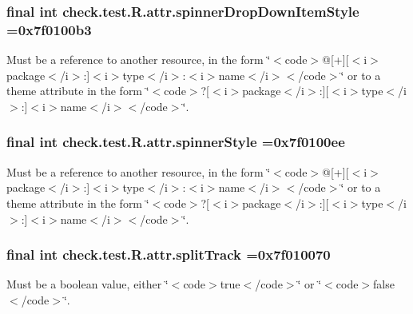 \subsubsection[{spinner\+Drop\+Down\+Item\+Style}]{\setlength{\rightskip}{0pt plus 5cm}final int check.\+test.\+R.\+attr.\+spinner\+Drop\+Down\+Item\+Style =0x7f0100b3\hspace{0.3cm}{\ttfamily [static]}}\label{classcheck_1_1test_1_1_r_1_1attr_a020a7df4dde5cf057bd1e5101a5782dc}
Must be a reference to another resource, in the form \char`\"{}$<$code$>$@\mbox{[}+\mbox{]}\mbox{[}$<$i$>$package$<$/i$>$\+:\mbox{]}$<$i$>$type$<$/i$>$\+:$<$i$>$name$<$/i$>$$<$/code$>$\char`\"{} or to a theme attribute in the form \char`\"{}$<$code$>$?\mbox{[}$<$i$>$package$<$/i$>$\+:\mbox{]}\mbox{[}$<$i$>$type$<$/i$>$\+:\mbox{]}$<$i$>$name$<$/i$>$$<$/code$>$\char`\"{}. \hypertarget{classcheck_1_1test_1_1_r_1_1attr_a8fc35d027aa55da918e529af0239cd45}{}
\subsubsection[{spinner\+Style}]{\setlength{\rightskip}{0pt plus 5cm}final int check.\+test.\+R.\+attr.\+spinner\+Style =0x7f0100ee\hspace{0.3cm}{\ttfamily [static]}}\label{classcheck_1_1test_1_1_r_1_1attr_a8fc35d027aa55da918e529af0239cd45}
Must be a reference to another resource, in the form \char`\"{}$<$code$>$@\mbox{[}+\mbox{]}\mbox{[}$<$i$>$package$<$/i$>$\+:\mbox{]}$<$i$>$type$<$/i$>$\+:$<$i$>$name$<$/i$>$$<$/code$>$\char`\"{} or to a theme attribute in the form \char`\"{}$<$code$>$?\mbox{[}$<$i$>$package$<$/i$>$\+:\mbox{]}\mbox{[}$<$i$>$type$<$/i$>$\+:\mbox{]}$<$i$>$name$<$/i$>$$<$/code$>$\char`\"{}. \hypertarget{classcheck_1_1test_1_1_r_1_1attr_ab99b6ed868beb51a77072e77f5938343}{}
\subsubsection[{split\+Track}]{\setlength{\rightskip}{0pt plus 5cm}final int check.\+test.\+R.\+attr.\+split\+Track =0x7f010070\hspace{0.3cm}{\ttfamily [static]}}\label{classcheck_1_1test_1_1_r_1_1attr_ab99b6ed868beb51a77072e77f5938343}
Must be a boolean value, either \char`\"{}$<$code$>$true$<$/code$>$\char`\"{} or \char`\"{}$<$code$>$false$<$/code$>$\char`\"{}. 


